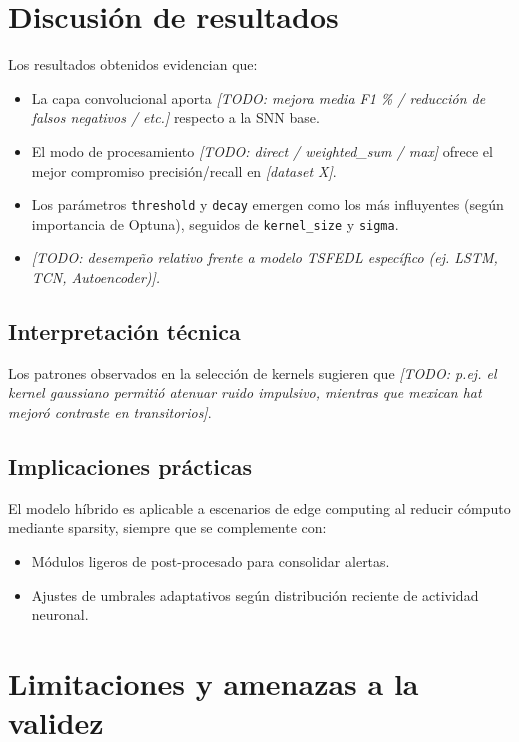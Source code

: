 \section{Discusión de resultados}
Los resultados obtenidos evidencian que:
\begin{itemize}
    \item La capa convolucional aporta \textit{[TODO: mejora media F1 \% / reducción de falsos negativos / etc.]} respecto a la SNN base.
    \item El modo de procesamiento \textit{[TODO: direct / weighted\_sum / max]} ofrece el mejor compromiso precisión/recall en \textit{[dataset X]}.
    \item Los parámetros \texttt{threshold} y \texttt{decay} emergen como los más influyentes (según importancia de Optuna), seguidos de \texttt{kernel\_size} y \texttt{sigma}.
    \item \textit{[TODO: desempeño relativo frente a modelo TSFEDL específico (ej. LSTM, TCN, Autoencoder)].}
\end{itemize}

\subsection{Interpretación técnica}
Los patrones observados en la selección de kernels sugieren que \textit{[TODO: p.ej. el kernel gaussiano permitió atenuar ruido impulsivo, mientras que mexican hat mejoró contraste en transitorios]}.

\subsection{Implicaciones prácticas}
El modelo híbrido es aplicable a escenarios de edge computing al reducir cómputo mediante sparsity, siempre que se complemente con:
\begin{itemize}
    \item Módulos ligeros de post-procesado para consolidar alertas.
    \item Ajustes de umbrales adaptativos según distribución reciente de actividad neuronal.
\end{itemize}

\section{Limitaciones y amenazas a la validez}
